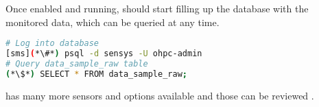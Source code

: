 \noindent  Once enabled and running, \Sensys{} should start filling up the
database with the monitored data, which can be queried at any time.

\begin{lstlisting}[language=bash,keywords={},upquote=true]
# Log into database
[sms](*\#*) psql -d sensys -U ohpc-admin
# Query data_sample_raw table
(*\$*) SELECT * FROM data_sample_raw;
\end{lstlisting}

\noindent \Sensys{} has many more sensors and options available and those can be
reviewed \href{https://intel-ctrlsys.github.io/sensys}{\color{blue}{here}}.
